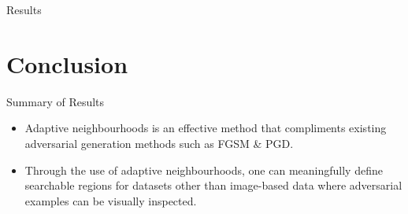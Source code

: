 \documentclass[smaller]{beamer}
\begin{document}
\begin{frame}[label={sec:org352b01d}]{Results}
\begin{table}
\caption{\label{tab:adv_fscore}$F_1$ score performance on the WAVES dataset using Faster R-CNN. Numbers highlighted in a bold font face indicate the best achieving adversarial attack for each form of defence.}
\centering
\begin{adjustbox}{center}
\end{adjustbox}
\end{table}
\end{frame}

\section{Conclusion}
\label{sec:orgd6b8901}

\begin{frame}[label={sec:org37c7592}]{Summary of Results}
\begin{itemize}
\item Adaptive neighbourhoods is an effective method that compliments existing
adversarial generation methods such as FGSM \& PGD.
\item Through the use of adaptive neighbourhoods, one can meaningfully define searchable
regions for datasets other than image-based data where adversarial examples can be
visually inspected.
\end{itemize}
\end{frame}
\end{document}
